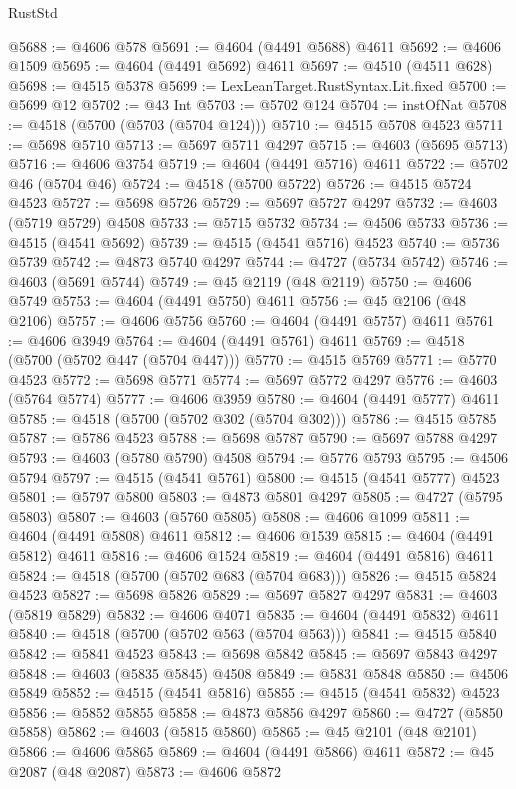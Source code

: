 \begin{lexlean}{RustStd}
\begin{coremodule}
@5688 := @4606 @578
@5691 := @4604 (@4491 @5688) @4611
@5692 := @4606 @1509
@5695 := @4604 (@4491 @5692) @4611
@5697 := @4510 (@4511 @628)
@5698 := @4515 @5378
@5699 := LexLeanTarget.RustSyntax.Lit.fixed
@5700 := @5699 @12
@5702 := @43 Int
@5703 := @5702 @124
@5704 := instOfNat
@5708 := @4518 (@5700 (@5703 (@5704 @124)))
@5710 := @4515 @5708 @4523
@5711 := @5698 @5710
@5713 := @5697 @5711 @4297
@5715 := @4603 (@5695 @5713)
@5716 := @4606 @3754
@5719 := @4604 (@4491 @5716) @4611
@5722 := @5702 @46 (@5704 @46)
@5724 := @4518 (@5700 @5722)
@5726 := @4515 @5724 @4523
@5727 := @5698 @5726
@5729 := @5697 @5727 @4297
@5732 := @4603 (@5719 @5729) @4508
@5733 := @5715 @5732
@5734 := @4506 @5733
@5736 := @4515 (@4541 @5692)
@5739 := @4515 (@4541 @5716) @4523
@5740 := @5736 @5739
@5742 := @4873 @5740 @4297
@5744 := @4727 (@5734 @5742)
@5746 := @4603 (@5691 @5744)
@5749 := @45 @2119 (@48 @2119)
@5750 := @4606 @5749
@5753 := @4604 (@4491 @5750) @4611
@5756 := @45 @2106 (@48 @2106)
@5757 := @4606 @5756
@5760 := @4604 (@4491 @5757) @4611
@5761 := @4606 @3949
@5764 := @4604 (@4491 @5761) @4611
@5769 := @4518 (@5700 (@5702 @447 (@5704 @447)))
@5770 := @4515 @5769
@5771 := @5770 @4523
@5772 := @5698 @5771
@5774 := @5697 @5772 @4297
@5776 := @4603 (@5764 @5774)
@5777 := @4606 @3959
@5780 := @4604 (@4491 @5777) @4611
@5785 := @4518 (@5700 (@5702 @302 (@5704 @302)))
@5786 := @4515 @5785
@5787 := @5786 @4523
@5788 := @5698 @5787
@5790 := @5697 @5788 @4297
@5793 := @4603 (@5780 @5790) @4508
@5794 := @5776 @5793
@5795 := @4506 @5794
@5797 := @4515 (@4541 @5761)
@5800 := @4515 (@4541 @5777) @4523
@5801 := @5797 @5800
@5803 := @4873 @5801 @4297
@5805 := @4727 (@5795 @5803)
@5807 := @4603 (@5760 @5805)
@5808 := @4606 @1099
@5811 := @4604 (@4491 @5808) @4611
@5812 := @4606 @1539
@5815 := @4604 (@4491 @5812) @4611
@5816 := @4606 @1524
@5819 := @4604 (@4491 @5816) @4611
@5824 := @4518 (@5700 (@5702 @683 (@5704 @683)))
@5826 := @4515 @5824 @4523
@5827 := @5698 @5826
@5829 := @5697 @5827 @4297
@5831 := @4603 (@5819 @5829)
@5832 := @4606 @4071
@5835 := @4604 (@4491 @5832) @4611
@5840 := @4518 (@5700 (@5702 @563 (@5704 @563)))
@5841 := @4515 @5840
@5842 := @5841 @4523
@5843 := @5698 @5842
@5845 := @5697 @5843 @4297
@5848 := @4603 (@5835 @5845) @4508
@5849 := @5831 @5848
@5850 := @4506 @5849
@5852 := @4515 (@4541 @5816)
@5855 := @4515 (@4541 @5832) @4523
@5856 := @5852 @5855
@5858 := @4873 @5856 @4297
@5860 := @4727 (@5850 @5858)
@5862 := @4603 (@5815 @5860)
@5865 := @45 @2101 (@48 @2101)
@5866 := @4606 @5865
@5869 := @4604 (@4491 @5866) @4611
@5872 := @45 @2087 (@48 @2087)
@5873 := @4606 @5872

\end{coremodule}
\end{lexlean}
